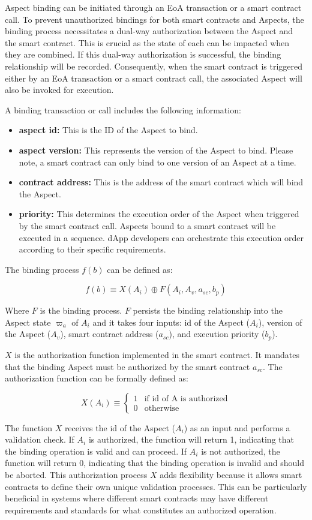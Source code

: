 Aspect binding can be initiated through an EoA transaction or a smart contract call. To prevent unauthorized bindings for both smart contracts and Aspects, the binding process necessitates a dual-way authorization between the Aspect and the smart contract. This is crucial as the state of each can be impacted when they are combined. If this dual-way authorization is successful, the binding relationship will be recorded. Consequently, when the smart contract is triggered either by an EoA transaction or a smart contract call, the associated Aspect will also be invoked for execution.

A binding transaction or call includes the following information:

\begin{itemize}
  \item \textbf{aspect id:} This is the ID of the Aspect to bind.
  \item \textbf{aspect version:} This represents the version of the Aspect to bind. Please note, a smart contract can only bind to one version of an Aspect at a time.
  \item \textbf{contract address:} This is the address of the smart contract which will bind the Aspect.
  \item \textbf{priority:} This determines the execution order of the Aspect when triggered by the smart contract call. Aspects bound to a smart contract will be executed in a sequence. dApp developers can orchestrate this execution order according to their specific requirements.
\end{itemize}

The binding process $f(b)$ can be defined as:

\[
f(b) \equiv X(A_i) \oplus F(A_i, A_v,a_{sc},b_p)
\]

Where $F$ is the binding process. $F$ persists the binding relationship into the Aspect state $\varpi_a$ of $A_i$ and it takes four inputs: id of the Aspect ($A_i$), version of the Aspect ($A_v$), smart contract address ($a_{sc}$), and execution priority ($b_p$).

$X$ is the authorization function implemented in the smart contract. It mandates that the binding Aspect must be authorized by the smart contract $a_{sc}$. The authorization function can be formally defined as:

\[
X(A_i) \equiv
\begin{cases}
  1 & \text{if id of A is authorized} \\
  0 & \text{otherwise}
\end{cases}
\]

The function $X$ receives the id of the Aspect ($A_i$) as an input and performs a validation check. If $A_i$ is authorized, the function will return 1, indicating that the binding operation is valid and can proceed. If $A_i$ is not authorized, the function will return 0, indicating that the binding operation is invalid and should be aborted. This authorization process $X$ adds flexibility because it allows smart contracts to define their own unique validation processes. This can be particularly beneficial in systems where different smart contracts may have different requirements and standards for what constitutes an authorized operation.
